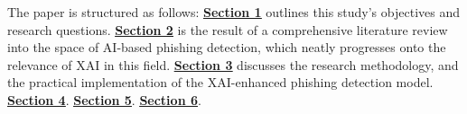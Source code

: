 
\noindent The paper is structured as follows: \hyperref[sec:1-introduction]{\uline{\textbf{Section 1}}} outlines this study's objectives and research questions. \hyperref[sec:2-literature-review]{\uline{\textbf{Section 2}}} is the result of a comprehensive literature review into the space of AI-based phishing detection, which neatly progresses onto the relevance of XAI in this field. \hyperref[sec:3-research-methodology]{\uline{\textbf{Section 3}}} discusses the research methodology, and the practical implementation of the XAI-enhanced phishing detection model. \hyperref[sec:4-results]{\uline{\textbf{Section 4}}}. \hyperref[sec:5-discussion]{\uline{\textbf{Section 5}}}. \hyperref[sec:6-conclusion]{\uline{\textbf{Section 6}}}.

